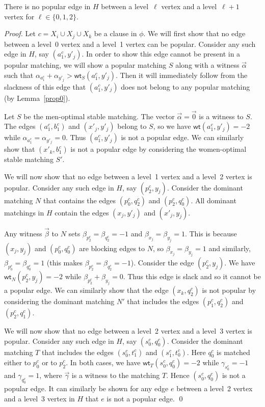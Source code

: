 \documentclass{llncs}
\newcommand{\wt}{\mathsf{wt}}
\begin{document}
\begin{lemma}
  \label{lem:separate}
  There is no popular edge in $H$ between a level~$\ell$ vertex and a level~$\ell+1$ vertex for $\ell \in \{0,1,2\}$.
\end{lemma}
\begin{proof}
  Let $c = X_i \cup X_j \cup X_k$ be a clause in $\phi$. We will first show that no edge between a level~0 vertex and a level~1 vertex can be popular.
  Consider any such edge  in $H$, say $(a^c_1,y'_j)$. In order to show this edge cannot be present in a popular matching, we will show a popular matching $S$ along
  with a witness $\vec{\alpha}$ such that $\alpha_{a^c_1} + \alpha_{y'_j} > \wt_S(a^c_1,y'_j)$. Then it will immediately follow from the slackness of this edge that
  $(a^c_1,y'_j)$ does not belong to any popular matching (by Lemma~\ref{prop0}).

  Let $S$ be the men-optimal stable matching. The vector $\vec{\alpha} = \vec{0}$ is a witness to $S$. The edges $(a^c_1,b^c_1)$
  and $(x'_j,y'_j)$ belong to $S$, so we have $\wt(a^c_1,y'_j) = -2$ while $\alpha_{a^c_1} = \alpha_{y'_j} = 0$. Thus $(a^c_1,y'_j)$ is not a popular edge.
  We can similarly show that $(x'_k,b^c_1)$ is not a popular edge by considering the women-optimal stable matching $S'$. 
 
  \smallskip
  
  We will now show that no edge between a level~1 vertex and a level~2 vertex is popular.
  Consider any such edge  in $H$, say $(p^c_2,y_j)$.
  Consider the dominant matching $N$ that contains the edges $(p^c_0,q^c_2)$ and $(p^c_2,q^c_0)$.
  All dominant matchings in $H$ contain the edges $(x_j,y'_j)$ and $(x'_j,y_j)$.

  Any witness $\vec{\beta}$ to $N$
  sets $\beta_{p^c_2} = \beta_{q^c_2} = -1$ and $\beta_{x_j} = \beta_{y_j} = 1$. This is because $(x_j,y_j)$ and $(p^c_0,q^c_0)$ are blocking edges to $N$,
  so $\beta_{x_j} = \beta_{y_j} = 1$ and similarly, $\beta_{p^c_0} = \beta_{q^c_0} = 1$ (this makes $\beta_{p^c_2} = \beta_{q^c_2} = -1$).
  Consider the edge $(p^c_2,y_j)$. We have $\wt_N(p^c_2,y_j) = -2$ while  $\beta_{p^c_2} + \beta_{y_j} = 0$. Thus this edge
  is slack and so it cannot be a popular edge. We can similarly show that the edge $(x_k,q^c_2)$ is not popular by considering the dominant matching $N'$
  that includes the edges $(p^c_1,q^c_2)$ and $(p^c_2,q^c_1)$.
 
  \smallskip
  
  We will now show that no edge between a level~2 vertex and a level~3 vertex is popular.
  Consider any such edge  in $H$, say $(s^c_0,q^c_0)$. Consider the dominant matching $T$ that includes the edges $(s^c_0,t^c_1)$ and $(s^c_1,t^c_0)$. Here $q^c_0$ is
  matched either to $p^c_0$ or to $p^c_2$. In both cases, we have $\wt_T(s^c_0,q^c_0) = -2$ while $\gamma_{s^c_0} = -1$ and $\gamma_{q^c_0} = 1$, where
  $\vec{\gamma}$ is a witness to the matching $T$. Hence $(s^c_0,q^c_0)$ is not a popular edge. It can similarly be shown for any edge $e$ 
  between a level~2 vertex and a level~3 vertex in $H$ that $e$ is not a popular edge. \qed
\end{proof}  
\end{document}
